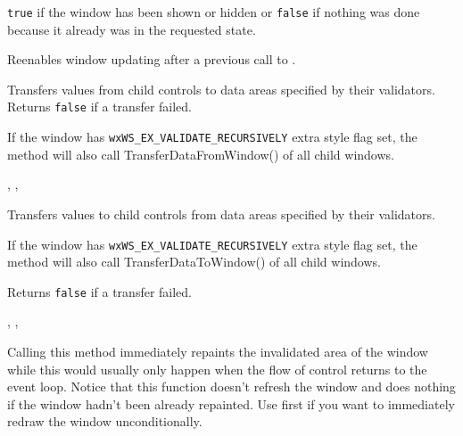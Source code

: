 {\tt true} if the window has been shown or hidden or {\tt false} if nothing was
done because it already was in the requested state.



\label{wxwindowthaw}


Reenables window updating after a previous call to
.

\label{wxwindowtransferdatafromwindow}


Transfers values from child controls to data areas specified by their validators. Returns
{\tt false} if a transfer failed.

If the window has {\tt wxWS\_EX\_VALIDATE\_RECURSIVELY} extra style flag set,
the method will also call TransferDataFromWindow() of all child windows.


,\rtfsp
{}, 

\label{wxwindowtransferdatatowindow}


Transfers values to child controls from data areas specified by their validators.

If the window has {\tt wxWS\_EX\_VALIDATE\_RECURSIVELY} extra style flag set,
the method will also call TransferDataToWindow() of all child windows.


Returns {\tt false} if a transfer failed.


,\rtfsp
{}, 

\label{wxwindowupdate}


Calling this method immediately repaints the invalidated area of the window
while this would usually only happen when the flow of control returns to the
event loop. Notice that this function doesn't refresh the window and does
nothing if the window hadn't been already repainted. Use 
 first if you want to immediately redraw the
window unconditionally.

